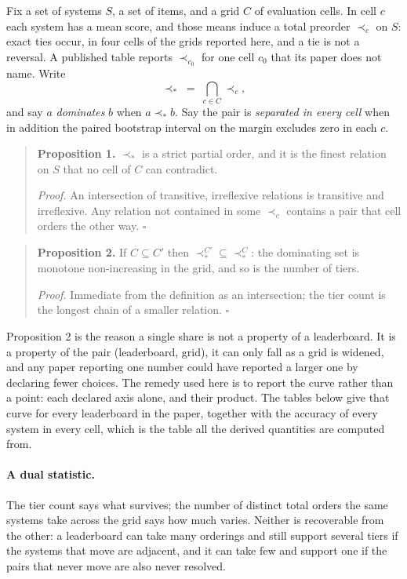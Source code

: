 \label{app:robustorder}

Fix a set of systems $S$, a set of items, and a grid $C$ of evaluation cells. In cell $c$ each
system has a mean score, and those means induce a total preorder $\prec_c$ on $S$: exact ties
occur, in four cells of the grids reported here, and a tie is not a reversal. A published table
reports $\prec_{c_0}$ for one cell $c_0$ that its paper does not name. Write
\[
  \prec_{\!*} \;=\; \bigcap_{c\in C} \prec_c ,
\]
and say $a$ \emph{dominates} $b$ when $a \prec_{\!*} b$. Say the pair is \emph{separated in every
cell} when in addition the paired bootstrap interval on the margin excludes zero in each $c$.

\begin{quote}
\textbf{Proposition 1.} $\prec_{\!*}$ is a strict partial order, and it is the finest relation on
$S$ that no cell of $C$ can contradict.

\emph{Proof.} An intersection of transitive, irreflexive relations is transitive and irreflexive.
Any relation not contained in some $\prec_c$ contains a pair that cell orders the other way.
\hfill$\square$
\end{quote}

\begin{quote}
\textbf{Proposition 2.} If $C \subseteq C'$ then $\prec_{\!*}^{C'} \subseteq \prec_{\!*}^{C}$: the
dominating set is monotone non-increasing in the grid, and so is the number of tiers.

\emph{Proof.} Immediate from the definition as an intersection; the tier count is the longest chain
of a smaller relation. \hfill$\square$
\end{quote}

Proposition 2 is the reason a single share is not a property of a leaderboard. It is a property of
the pair (leaderboard, grid), it can only fall as a grid is widened, and any paper reporting one
number could have reported a larger one by declaring fewer choices. The remedy used here is to
report the curve rather than a point: each declared axis alone, and their product. The tables below
give that curve for every leaderboard in the paper, together with the accuracy of every system in
every cell, which is the table all the derived quantities are computed from.


\paragraph{A dual statistic.} The tier count says what survives; the number of distinct total
orders the same systems take across the grid says how much varies. Neither is recoverable from the
other: a leaderboard can take many orderings and still support several tiers if the systems that
move are adjacent, and it can take few and support one if the pairs that never move are also never
resolved.

